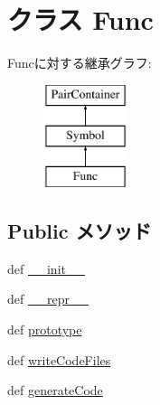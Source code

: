 \hypertarget{classslicc_1_1symbols_1_1Func_1_1Func}{
\section{クラス Func}
\label{classslicc_1_1symbols_1_1Func_1_1Func}
}
Funcに対する継承グラフ:\begin{figure}[H]
\begin{center}
\leavevmode
\includegraphics[height=3cm]{classslicc_1_1symbols_1_1Func_1_1Func}
\end{center}
\end{figure}
\subsection*{Public メソッド}
\begin{DoxyCompactItemize}
\item 
def \hyperlink{classslicc_1_1symbols_1_1Func_1_1Func_ac775ee34451fdfa742b318538164070e}{\_\-\_\-init\_\-\_\-}
\item 
def \hyperlink{classslicc_1_1symbols_1_1Func_1_1Func_ad8b9328939df072e4740cd9a63189744}{\_\-\_\-repr\_\-\_\-}
\item 
def \hyperlink{classslicc_1_1symbols_1_1Func_1_1Func_aed550921000a7ea279bf6205c2c868ef}{prototype}
\item 
def \hyperlink{classslicc_1_1symbols_1_1Func_1_1Func_a69d0582bde832d4ff45237ab5ff116bb}{writeCodeFiles}
\item 
def \hyperlink{classslicc_1_1symbols_1_1Func_1_1Func_aa44489eb55d022e2e4a244d043b80f72}{generateCode}
\end{DoxyCompactItemize}
